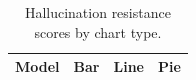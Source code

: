 \begin{table}[t]
\centering
\small
\begin{tabular}{@{}lrrr@{}}
\toprule
\textbf{Model} & \textbf{Bar} & \textbf{Line} & \textbf{Pie} \\
\midrule
\bottomrule
\end{tabular}
\caption{Hallucination resistance scores by chart type.}
\label{tab:resistance-chart-type}
\end{table}